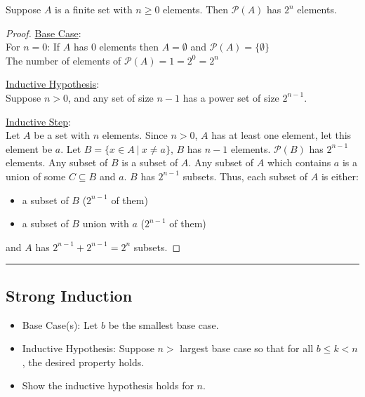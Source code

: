 \documentclass{article}
\def \proofDistance {5pt}
\newcommand{\proofseparator}{\par\noindent\rule{\textwidth}{0.4pt}}
\newcommand{\pf}[1]{
    \vspace{\proofDistance}
    \begin{proof}
    #1
    \end{proof}
    \proofseparator
}
\begin{document}
        \begin{example}
            Suppose $A$ is a finite set with $n \geq 0$ elements. Then $\mathcal{P}(A)$ has $2^n$ elements.
        \end{example}
        \pf {
            \item \underline{Base Case}: \\
            For $n = 0$: If $A$ has 0 elements then $A = \emptyset$ and $\mathcal{P}(A) = \{\emptyset\}$ \\
            The number of elements of $\mathcal{P}(A) = 1 = 2^0 = 2^n$ \\
            \item \underline{Inductive Hypothesis}: \\
            Suppose $n > 0$, and any set of size $n-1$ has a power set of size $2^{n-1}$. \\
            \item \underline{Inductive Step}: \\
            Let $A$ be a set with $n$ elements. Since $n > 0$, $A$ has at least one element, let this element be $a$. Let $B = \{x \in A \ | \ x \neq a\}$, $B$ has $n-1$ elements. $\mathcal{P}(B)$ has $2^{n-1}$ elements. Any subset of $B$ is a subset of $A$. Any subset of $A$ which contains $a$ is a union of some $C \subseteq B$ and ${a}$. $B$ has $2^{n-1}$ subsets. Thus, each subset of $A$ is either: 
            \begin{itemize}
                \item a subset of $B$ ($2^{n-1}$ of them)
                \item a subset of $B$ union with ${a}$ ($2^{n-1}$ of them)
            \end{itemize}
            and $A$ has $2^{n-1} + 2^{n-1} = 2^n$ subsets.
        }

\newpage

    \subsection{Strong Induction}

        \begin{itemize}
            \item Base Case(s): Let $b$ be the smallest base case. 
            \item Inductive Hypothesis: Suppose $n >$ largest base case so that for all $b \leq k < n$, the desired property holds. 
            \item Show the inductive hypothesis holds for $n$.
        \end{itemize}
\end{document}
